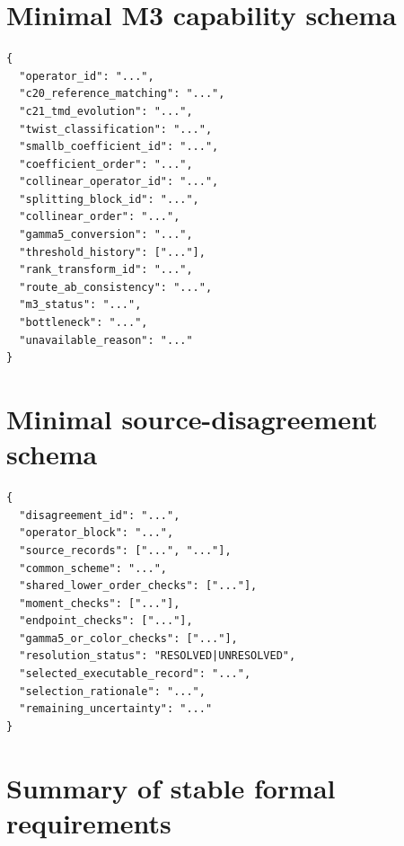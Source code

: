 \documentclass[11pt]{article}
\begin{document}
\section{Minimal M3 capability schema}
\label{app:capability-schema}

\begin{verbatim}
{
  "operator_id": "...",
  "c20_reference_matching": "...",
  "c21_tmd_evolution": "...",
  "twist_classification": "...",
  "smallb_coefficient_id": "...",
  "coefficient_order": "...",
  "collinear_operator_id": "...",
  "splitting_block_id": "...",
  "collinear_order": "...",
  "gamma5_conversion": "...",
  "threshold_history": ["..."],
  "rank_transform_id": "...",
  "route_ab_consistency": "...",
  "m3_status": "...",
  "bottleneck": "...",
  "unavailable_reason": "..."
}
\end{verbatim}

\section{Minimal source-disagreement schema}
\label{app:disagreement-schema}

\begin{verbatim}
{
  "disagreement_id": "...",
  "operator_block": "...",
  "source_records": ["...", "..."],
  "common_scheme": "...",
  "shared_lower_order_checks": ["..."],
  "moment_checks": ["..."],
  "endpoint_checks": ["..."],
  "gamma5_or_color_checks": ["..."],
  "resolution_status": "RESOLVED|UNRESOLVED",
  "selected_executable_record": "...",
  "selection_rationale": "...",
  "remaining_uncertainty": "..."
}
\end{verbatim}

\section{Summary of stable formal requirements}
\label{app:requirements}
\end{document}
